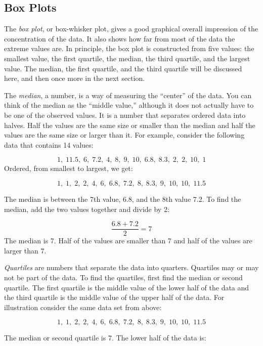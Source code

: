 \documentclass[
]{krantz}
\theoremstyle{definition}
\theoremstyle{definition}
\theoremstyle{definition}
\theoremstyle{remark}
\begin{document}
\hypertarget{box-plots}{%
\subsection{Box Plots}\label{box-plots}}

The \emph{box plot}, or box-whisker plot, gives a good graphical overall
impression of the concentration of the data. It also shows how far from
most of the data the extreme values are. In principle, the box plot is
constructed from five values: the smallest value, the first quartile,
the median, the third quartile, and the largest value. The median, the
first quartile, and the third quartile will be discussed here, and then
once more in the next section.

The \emph{median}, a number, is a way of measuring the ``center'' of the data.
You can think of the median as the ``middle value,'' although it does not
actually have to be one of the observed values. It is a number that
separates ordered data into halves. Half the values are the same size or
smaller than the median and half the values are the same size or larger
than it. For example, consider the following data that contains 14
values:

\[1,\;   11.5,\;   6,\;   7.2,\;   4,\;   8,\;   9,\;   10,\;   6.8,\;   8.3,\;   2,\;   2,\;   10,\;   1\]
Ordered, from smallest to largest, we get:

\[1,\;   1,\;   2,\;   2,\;   4,\;   6,\;   6.8,\;   7.2,\;   8,\;   8.3,\;   9,\;   10,\;   10,\;   11.5\]

The median is between the 7th value, 6.8, and the 8th value 7.2. To find
the median, add the two values together and divide by 2:

\[\frac{6.8+7.2}{2} = 7\] The median is 7. Half of the values are
smaller than 7 and half of the values are larger than 7.

\emph{Quartiles} are numbers that separate the data into quarters. Quartiles
may or may not be part of the data. To find the quartiles, first find
the median or second quartile. The first quartile is the middle value of
the lower half of the data and the third quartile is the middle value of
the upper half of the data. For illustration consider the same data set
from above:

\[1,\;   1,\;   2,\;   2,\;   4,\;   6,\;   6.8,\;   7.2,\;   8,\;   8.3,\;   9,\;   10,\;   10,\;   11.5\]

The median or second quartile is 7. The lower half of the data is:
\end{document}
